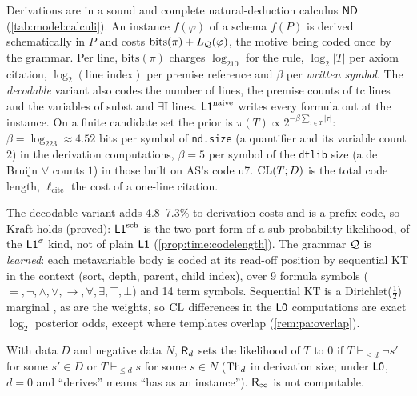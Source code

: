 \begin{definition}\pabrk{}\label{def:pa:lsch}
Derivations are in a sound and complete natural-deduction calculus $\mathsf{ND}$ (\cref{tab:model:calculi}). An instance $f(\varphi)$ of a schema $f(P)$ is derived schematically in $P$ and costs $\mathrm{bits}(\pi)+L_{\mathcal{Q}}(\varphi)$, the motive being coded once by the grammar. Per line, $\mathrm{bits}(\pi)$ charges $\log_210$ for the rule, $\log_2|T|$ per axiom citation, $\log_2(\text{line index})$ per premise reference and $\beta$ per \emph{written symbol}. The \emph{decodable} variant also codes the number of lines, the premise counts of tc lines and the variables of subst and $\exists$I lines. $\mathord{\mathsf{L1}}^{\mathrm{naive}}$ writes every formula out at the instance. On a finite candidate set the prior is $\pi(T)\propto2^{-\beta\sum_{\tau\in T}|\tau|}$: $\beta=\log_223\approx4.52$ bits per symbol of \texttt{nd.size} (a quantifier and its variable count $2$) in the derivation computations, $\beta=5$ per symbol of the \texttt{dtlib} size (a de Bruijn $\forall$ counts $1$) in those built on AS's code u7. $\mathrm{CL}(T;D)$ is the total code length, $\ell_{\mathrm{cite}}$ the cost of a one-line citation.
\end{definition}

\noindent The decodable variant adds 4.8--7.3\% to derivation costs and is a prefix code, so Kraft holds (proved): $\mathord{\mathsf{L1}}^{\mathrm{sch}}$ is the two-part form of a sub-probability likelihood, of the $\mathord{\mathsf{L1}}^{\sigma}$ kind, not of plain $\mathord{\mathsf{L1}}$ (\cref{prop:time:codelength}). The grammar $\mathcal{Q}$ is \emph{learned}: each metavariable body is coded at its read-off position by sequential KT in the context (sort, depth, parent, child index), over 9 formula symbols ($=,\neg,\wedge,\vee,\to,\forall,\exists,\top,\bot$) and 14 term symbols. Sequential KT is a Dirichlet($\frac12$) marginal \citep{krichevsky1981performance}, as are the weights, so $\mathrm{CL}$ differences in the $\mathord{\mathsf{L0}}$ computations are exact $\log_2$ posterior odds, except where templates overlap (\cref{rem:pa:overlap}).

\begin{definition}\pabrk{}\label{def:pa:refute}
With data $D$ and negative data $N$, $\mathsf{R}_{d}$ sets the likelihood of $T$ to $0$ if $T\vdash_{\le d}\neg s'$ for some $s'\in D$ or $T\vdash_{\le d}s$ for some $s\in N$ ($\mathrm{Th}_d$ in derivation size; under $\mathord{\mathsf{L0}}$, $d=0$ and ``derives'' means ``has as an instance''). $\mathsf{R}_{\infty}$ is not computable.
\end{definition}

